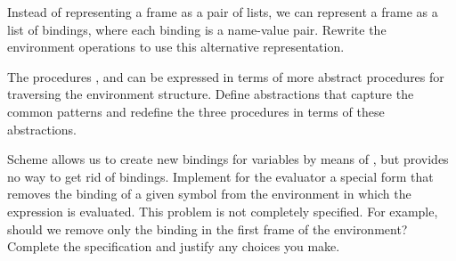 \begin{exercise}
	\label{Exercise 4.11}
	Instead of representing a frame as a pair of lists, we can represent a frame as a list of bindings, where each binding is a name-value pair.
	Rewrite the environment operations to use this alternative representation.
\end{exercise}



\begin{exercise}
	\label{Exercise 4.12}
	The procedures ,  and  can be expressed in terms of more abstract procedures for traversing the environment structure.
	Define abstractions that capture the common patterns and redefine the three procedures in terms of these abstractions.
\end{exercise}



\begin{exercise}
	\label{Exercise 4.13}
	Scheme allows us to create new bindings for variables by means of , but provides no way to get rid of bindings.
	Implement for the evaluator a special form  that removes the binding of a given symbol from the environment in which the  expression is evaluated.
	This problem is not completely specified.
	For example, should we remove only the binding in the first frame of the environment?
	Complete the specification and justify any choices you make.
\end{exercise}
